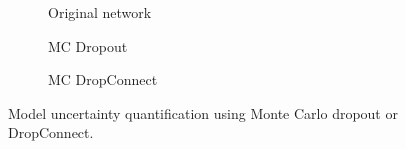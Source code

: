 \begin{figure}[htb]
\begin{subfigure}{0.24\textwidth}
        \caption{Original network}
        \label{fig:mcdrop1}
      \end{subfigure}
      \hfill
      \begin{subfigure}{0.33\textwidth}
        \usebox{\largestimage}
        \caption{MC Dropout}
        \label{fig:mcdrop2}
      \end{subfigure}
      \hfill
      \begin{subfigure}{0.33\textwidth}
        \caption{MC DropConnect}
        \label{fig:mcdrop3}
      \end{subfigure}
      \caption{Model uncertainty quantification using Monte Carlo dropout or DropConnect.}
      \label{fig:mcdrop}
    \end{figure}
